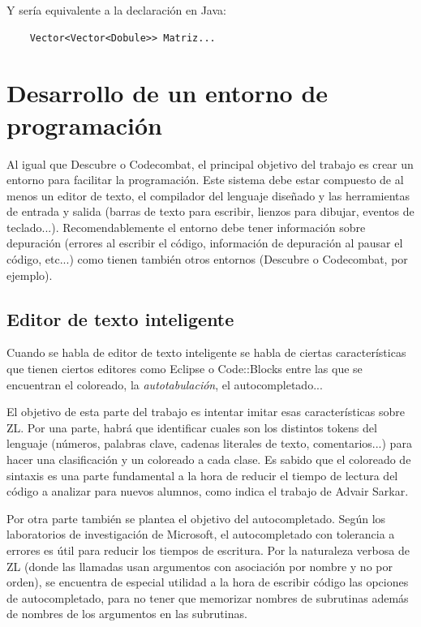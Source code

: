 \documentclass{report}
\begin{document}
	Y sería equivalente a la declaración en Java:
	
	\begin{BVerbatim}
	Vector<Vector<Dobule>> Matriz...
	\end{BVerbatim}
	

	\section{Desarrollo de un entorno de programación}
	
	Al igual que Descubre o Codecombat, el principal objetivo del trabajo es crear un entorno para facilitar la programación. Este sistema debe estar compuesto de al menos un editor de texto, el compilador del lenguaje diseñado y las herramientas de entrada y salida (barras de texto para escribir, lienzos para dibujar, eventos de teclado...). Recomendablemente el entorno debe tener información sobre depuración (errores al escribir el código, información de depuración al pausar el código, etc...) como tienen también otros entornos (Descubre o Codecombat, por ejemplo).
	
	\subsection{Editor de texto inteligente}
	
	Cuando se habla de editor de texto inteligente se habla de ciertas características que tienen ciertos editores como Eclipse o Code::Blocks entre las que se encuentran el coloreado, la \textit{autotabulación}, el autocompletado... 
	
	\vspace{10px}
	
	El objetivo de esta parte del trabajo es intentar imitar esas características sobre ZL. Por una parte, habrá que identificar cuales son los distintos tokens del lenguaje (números, palabras clave, cadenas literales de texto, comentarios...) para hacer una clasificación y un coloreado a cada clase. Es sabido que el coloreado de sintaxis es una parte fundamental a la hora de reducir el tiempo de lectura del código a analizar para nuevos alumnos, como indica el trabajo de Advair Sarkar\cite{syntaxhighlight}.
	
	\vspace{10px}
	
	Por otra parte también se plantea el objetivo del autocompletado. Según los laboratorios de investigación de Microsoft, el autocompletado con tolerancia a errores es útil para reducir los tiempos de escritura\cite{microsoftresearchautocomplete}. Por la naturaleza verbosa de ZL (donde las llamadas usan argumentos con asociación por nombre y no por orden), se encuentra de especial utilidad a la hora de escribir código las opciones de autocompletado, para no tener que memorizar nombres de subrutinas además de nombres de los argumentos en las subrutinas. 
\end{document}

